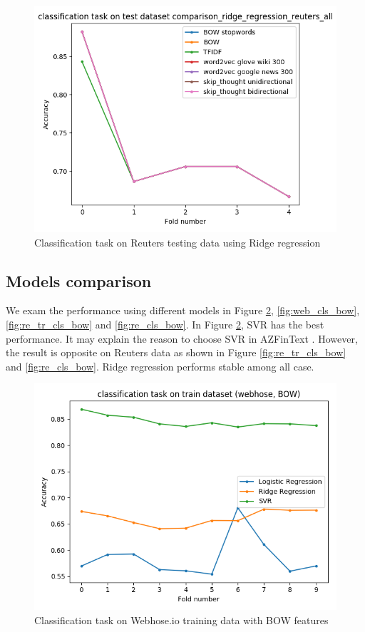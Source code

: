 \documentclass[sigconf]{acmart}
\begin{document}
\begin{figure}
  \includegraphics[width=\linewidth]{../../picture/experiment/classification_test_comparison_ridge_regression_reuters_all.png}
  \caption{Classification task on Reuters testing data using Ridge regression}
  \label{fig:re_cls_all}
\end{figure}

\subsection{Models comparison}
We exam the performance using different models in Figure \ref{fig:web_tr_cls_bow}, \ref{fig:web_cls_bow}, \ref{fig:re_tr_cls_bow} and \ref{fig:re_cls_bow}. In Figure \ref{fig:web_tr_cls_bow}, SVR has the best performance. It may explain the reason to choose
SVR in AZFinText \cite{AZFinText}. However, the result is opposite on Reuters data as shown in Figure \ref{fig:re_tr_cls_bow} and \ref{fig:re_cls_bow}. Ridge regression performs stable among all case.

\begin{figure}
  \includegraphics[width=\linewidth]{../../picture/experiment/classification_train_(webhose,_BOW).png}
  \caption{Classification task on Webhose.io training data with BOW features}
  \label{fig:web_tr_cls_bow}
\end{figure}
\end{document}
